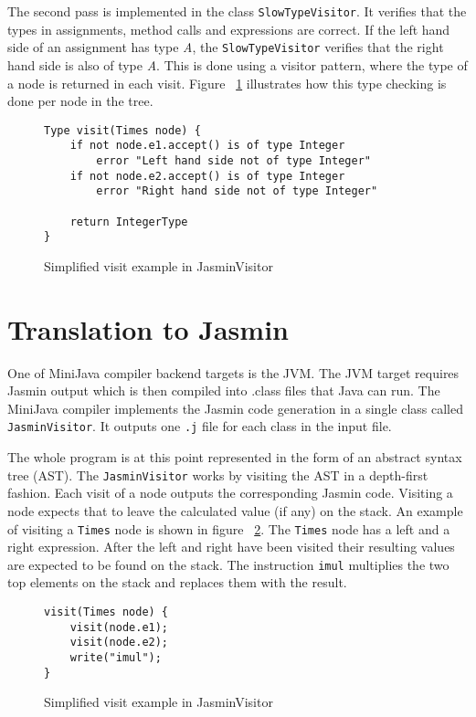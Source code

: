 \documentclass[11pt]{amsart}
\begin{document}
	The second pass is implemented in the class \texttt{SlowTypeVisitor}. It verifies that the types in assignments, method calls and expressions are correct. If the left hand side of an assignment has type \textit{A}, the \texttt{SlowTypeVisitor} verifies that the right hand side is also of type \textit{A}. This is done using a visitor pattern, where the type of a node is returned in each visit. Figure ~\ref{fig:timestypecheck} illustrates how this type checking is done per node in the tree.

	\begin{figure}[H]
		\begin{lstlisting}
Type visit(Times node) {
	if not node.e1.accept() is of type Integer
		error "Left hand side not of type Integer"
	if not node.e2.accept() is of type Integer
		error "Right hand side not of type Integer"

	return IntegerType
}
		\end{lstlisting}
		\caption{Simplified visit example in JasminVisitor}
		\label{fig:timestypecheck}
	\end{figure}

\section{Translation to Jasmin}
	One of MiniJava compiler backend targets is the JVM. The JVM target requires Jasmin\cite{jasmin} output which is then compiled into .class files that Java can run. The MiniJava compiler implements the Jasmin code generation in a single class called \texttt{JasminVisitor}. It outputs one \texttt{.j} file for each class in the input file.

	The whole program is at this point represented in the form of an abstract syntax tree (AST). The \texttt{JasminVisitor} works by visiting the AST in a depth-first fashion. Each visit of a node outputs the corresponding Jasmin code. Visiting a node expects that to leave the calculated value (if any) on the stack. An example of visiting a \texttt{Times} node is shown in figure ~\ref{fig:timesexample}. The \texttt{Times} node has a left and a right expression. After the left and right have been visited their resulting values are expected to be found on the stack. The instruction \texttt{imul} multiplies the two top elements on the stack and replaces them with the result.

	\begin{figure}[H]
		\begin{lstlisting}
visit(Times node) {
	visit(node.e1);
	visit(node.e2);
	write("imul");
}
		\end{lstlisting}
		\caption{Simplified visit example in JasminVisitor}
		\label{fig:timesexample}
	\end{figure}
\end{document}
